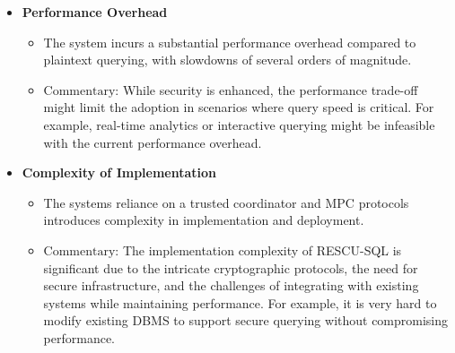 \documentclass[
]{article}
\begin{document}
\begin{itemize}
\item
  \textbf{Performance Overhead}

  \begin{itemize}
  \item
    The system incurs a substantial performance overhead compared to
    plaintext querying, with slowdowns of several orders of magnitude.
  \item
    \(\boxed{\text{Commentary}}\): While security is enhanced, the
    performance trade-off might limit the adoption in scenarios where
    query speed is critical. For example, real-time analytics or
    interactive querying might be infeasible with the current
    performance overhead.
  \end{itemize}
\item
  \textbf{Complexity of Implementation}

  \begin{itemize}
  \item
    The system\textquotesingle s reliance on a trusted coordinator and
    MPC protocols introduces complexity in implementation and
    deployment.
  \item
    \(\boxed{\text{Commentary}}\): The implementation complexity of
    RESCU-SQL is significant due to the intricate cryptographic
    protocols, the need for secure infrastructure, and the challenges of
    integrating with existing systems while maintaining performance. For
    example, it is very hard to modify existing DBMS to support secure
    querying without compromising performance.
  \end{itemize}
\end{itemize}
\end{document}
